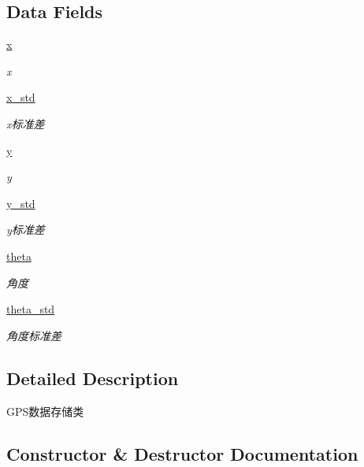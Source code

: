 \subsection*{Data Fields}
\begin{DoxyCompactItemize}
\item 
\hyperlink{classfuse___g___a_1_1_g_p_s__unit_a7cac02837e76bc2936ee9641de5ce612}{x}
\begin{DoxyCompactList}\small\item\em x \end{DoxyCompactList}\item 
\hyperlink{classfuse___g___a_1_1_g_p_s__unit_a424179e1e7d8b8737c0c66994c1d9115}{x\+\_\+std}
\begin{DoxyCompactList}\small\item\em x标准差 \end{DoxyCompactList}\item 
\hyperlink{classfuse___g___a_1_1_g_p_s__unit_a3dfeed8b83a48876bc937c4fdc170007}{y}
\begin{DoxyCompactList}\small\item\em y \end{DoxyCompactList}\item 
\hyperlink{classfuse___g___a_1_1_g_p_s__unit_a4924ef739dcf3503a6707660919abcf3}{y\+\_\+std}
\begin{DoxyCompactList}\small\item\em y标准差 \end{DoxyCompactList}\item 
\hyperlink{classfuse___g___a_1_1_g_p_s__unit_a6918b495faf7f0e7f79837f3f42582b5}{theta}
\begin{DoxyCompactList}\small\item\em 角度 \end{DoxyCompactList}\item 
\hyperlink{classfuse___g___a_1_1_g_p_s__unit_a9e430394dada73ab30cc7519d2cb9ca4}{theta\+\_\+std}
\begin{DoxyCompactList}\small\item\em 角度标准差 \end{DoxyCompactList}\end{DoxyCompactItemize}


\subsection{Detailed Description}
G\+P\+S数据存储类 



\subsection{Constructor \& Destructor Documentation}
\mbox{\label{classfuse___g___a_1_1_g_p_s__unit_ab1460cfab04ea31eb242f739415f60ea}} 
